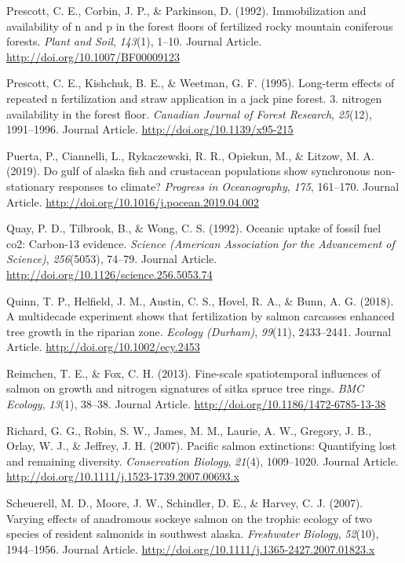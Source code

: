 \documentclass [11pt, proquest] {uwthesis}[2015/03/03]
\begin{document}
\hypertarget{ref-Prescott1992}{}
Prescott, C. E., Corbin, J. P., \& Parkinson, D. (1992). Immobilization
and availability of n and p in the forest floors of fertilized rocky
mountain coniferous forests. \emph{Plant and Soil}, \emph{143}(1),
1--10. Journal Article. \url{http://doi.org/10.1007/BF00009123}

\hypertarget{ref-Prescott1995}{}
Prescott, C. E., Kishchuk, B. E., \& Weetman, G. F. (1995). Long-term
effects of repeated n fertilization and straw application in a jack pine
forest. 3. nitrogen availability in the forest floor. \emph{Canadian
Journal of Forest Research}, \emph{25}(12), 1991--1996. Journal Article.
\url{http://doi.org/10.1139/x95-215}

\hypertarget{ref-Puerta2019}{}
Puerta, P., Ciannelli, L., Rykaczewski, R. R., Opiekun, M., \& Litzow,
M. A. (2019). Do gulf of alaska fish and crustacean populations show
synchronous non-stationary responses to climate? \emph{Progress in
Oceanography}, \emph{175}, 161--170. Journal Article.
\url{http://doi.org/10.1016/j.pocean.2019.04.002}

\hypertarget{ref-Quay1992}{}
Quay, P. D., Tilbrook, B., \& Wong, C. S. (1992). Oceanic uptake of
fossil fuel co2: Carbon-13 evidence. \emph{Science (American Association
for the Advancement of Science)}, \emph{256}(5053), 74--79. Journal
Article. \url{http://doi.org/10.1126/science.256.5053.74}

\hypertarget{ref-Quinn2018}{}
Quinn, T. P., Helfield, J. M., Austin, C. S., Hovel, R. A., \& Bunn, A.
G. (2018). A multidecade experiment shows that fertilization by salmon
carcasses enhanced tree growth in the riparian zone. \emph{Ecology
(Durham)}, \emph{99}(11), 2433--2441. Journal Article.
\url{http://doi.org/10.1002/ecy.2453}

\hypertarget{ref-Reimchen2013}{}
Reimchen, T. E., \& Fox, C. H. (2013). Fine-scale spatiotemporal
influences of salmon on growth and nitrogen signatures of sitka spruce
tree rings. \emph{BMC Ecology}, \emph{13}(1), 38--38. Journal Article.
\url{http://doi.org/10.1186/1472-6785-13-38}

\hypertarget{ref-Gustafson2007}{}
Richard, G. G., Robin, S. W., James, M. M., Laurie, A. W., Gregory, J.
B., Orlay, W. J., \& Jeffrey, J. H. (2007). Pacific salmon extinctions:
Quantifying lost and remaining diversity. \emph{Conservation Biology},
\emph{21}(4), 1009--1020. Journal Article.
\url{http://doi.org/10.1111/j.1523-1739.2007.00693.x}

\hypertarget{ref-Scheuerell2007}{}
Scheuerell, M. D., Moore, J. W., Schindler, D. E., \& Harvey, C. J.
(2007). Varying effects of anadromous sockeye salmon on the trophic
ecology of two species of resident salmonids in southwest alaska.
\emph{Freshwater Biology}, \emph{52}(10), 1944--1956. Journal Article.
\url{http://doi.org/10.1111/j.1365-2427.2007.01823.x}
\end{document}
